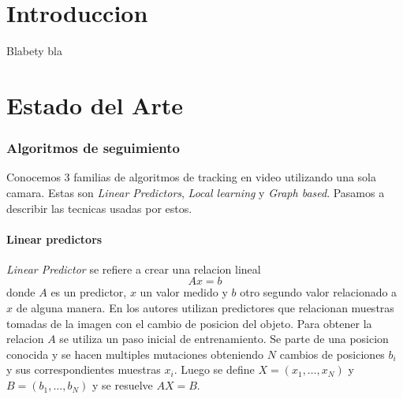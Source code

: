 \documentclass[a4paper,10pt]{article}
\title{}
\date{20 de Septiembre de 2013}
\author{Civile, Juan Pablo \and Crespo, Álvaro \and Ordano, Esteban }
\begin{document}
\pagestyle{fancy}
\maketitle
\thispagestyle{fancy}

\begin{customabstract}
\textbf{
}
\end{customabstract}

\begin{keywords}
\end{keywords}

\newpage

\part*{Introduccion}

Blabety bla

\newpage

\part*{Estado del Arte}


\section{Algoritmos de seguimiento}

Conocemos 3 familias de algoritmos de tracking en video utilizando una sola camara.
Estas son \textit{Linear Predictors}, \textit{Local learning} y \textit{Graph based}.
Pasamos a describir las tecnicas usadas por estos.

\subsection{Linear predictors}

\textit{Linear Predictor} se refiere a crear una relacion lineal \[ Ax = b \] donde $A$ es un predictor, $x$ un valor medido y $b$ otro segundo valor relacionado a $x$ de alguna manera.
En \cite{alp, original-linear-predictors} los autores utilizan predictores que relacionan muestras tomadas de la imagen con el cambio de posicion del objeto.
Para obtener la relacion $A$ se utiliza un paso inicial de entrenamiento.
Se parte de una posicion conocida y se hacen multiples mutaciones obteniendo $N$ cambios de posiciones $b_i$ y sus correspondientes muestras $x_i$.
Luego se define $X = (x_1, \dots, x_N)$ y $B = (b_1, \dots, b_N)$ y se resuelve $AX = B$.
\end{document}
